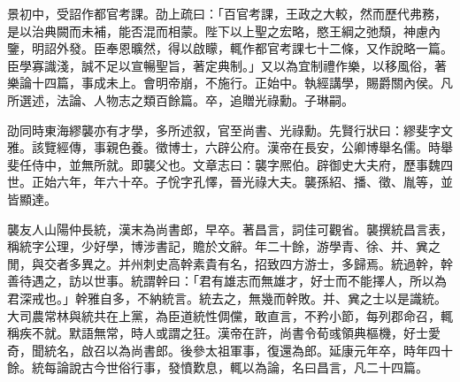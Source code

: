 \begin{pinyinscope}
景初中，受詔作都官考課。劭上疏曰：「百官考課，王政之大較，然而歷代弗務，是以治典闕而未補，能否混而相蒙。陛下以上聖之宏略，愍王綱之弛頹，神慮內鑒，明詔外發。臣奉恩曠然，得以啟矇，輒作都官考課七十二條，又作說略一篇。臣學寡識淺，誠不足以宣暢聖旨，著定典制。」又以為宜制禮作樂，以移風俗，著樂論十四篇，事成未上。會明帝崩，不施行。正始中。執經講學，賜爵關內侯。凡所選述，法論、人物志之類百餘篇。卒，追贈光祿勳。子琳嗣。

劭同時東海繆襲亦有才學，多所述叙，官至尚書、光祿勳。先賢行狀曰：繆斐字文雅。該覽經傳，事親色養。徵博士，六辟公府。漢帝在長安，公卿博舉名儒。時舉斐任侍中，並無所就。即襲父也。文章志曰：襲字熈伯。辟御史大夫府，歷事魏四世。正始六年，年六十卒。子恱字孔懌，晉光祿大夫。襲孫紹、播、徵、胤等，並皆顯達。

襲友人山陽仲長統，漢末為尚書郎，早卒。著昌言，詞佳可觀省。襲撰統昌言表，稱統字公理，少好學，博涉書記，贍於文辭。年二十餘，游學青、徐、并、兾之閒，與交者多異之。并州刺史高幹素貴有名，招致四方游士，多歸焉。統過幹，幹善待遇之，訪以世事。統謂幹曰：「君有雄志而無雄才，好士而不能擇人，所以為君深戒也。」幹雅自多，不納統言。統去之，無幾而幹敗。并、兾之士以是識統。大司農常林與統共在上黨，為臣道統性倜儻，敢直言，不矜小節，每列郡命召，輒稱疾不就。默語無常，時人或謂之狂。漢帝在許，尚書令荀彧領典樞機，好士愛奇，聞統名，啟召以為尚書郎。後參太祖軍事，復還為郎。延康元年卒，時年四十餘。統每論說古今世俗行事，發憤歎息，輒以為論，名曰昌言，凡二十四篇。


\end{pinyinscope}
